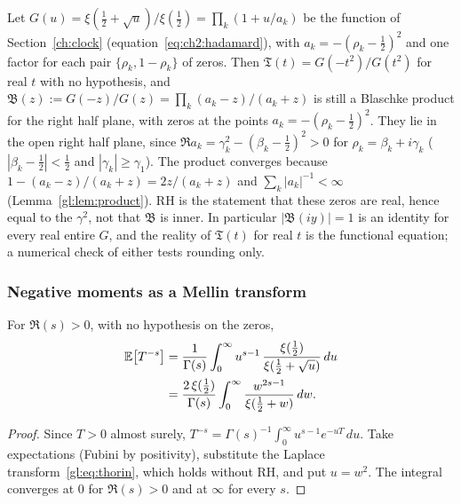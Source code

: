 \begin{remark}[Without RH]\label{gl:rem:blaschke}
Let $G(u)=\xi(\tfrac12+\sqrt u)/\xi(\tfrac12)=\prod_k(1+u/a_k)$ be the function of Section~\ref{ch:clock} (equation~\eqref{eq:ch2:hadamard}), with $a_k=-(\rho_k-\tfrac12)^2$ and one factor for each pair $\{\rho_k,1-\rho_k\}$ of zeros. Then $\mathfrak T(t)=G(-t^2)/G(t^2)$ for real $t$ with no hypothesis, and $\mathfrak B(z):=G(-z)/G(z)=\prod_k(a_k-z)/(a_k+z)$ is still a Blaschke product for the right half plane, with zeros at the points $a_k=-(\rho_k-\tfrac12)^2$. They lie in the open right half plane, since $\Re a_k=\gamma_k^2-(\beta_k-\tfrac12)^2>0$ for $\rho_k=\beta_k+i\gamma_k$ ($|\beta_k-\tfrac12|<\tfrac12$ and $|\gamma_k|\ge\gamma_1$). The product converges because $1-(a_k-z)/(a_k+z)=2z/(a_k+z)$ and $\sum_k|a_k|^{-1}<\infty$ (Lemma~\ref{gl:lem:product}). RH is the statement that these zeros are real, hence equal to the $\gamma^2$, not that $\mathfrak B$ is inner. In particular $|\mathfrak B(iy)|=1$ is an identity for every real entire $G$, and the reality of $\mathfrak T(t)$ for real $t$ is the functional equation; a numerical check of either tests rounding only.
\end{remark}

\subsubsection{Negative moments as a Mellin transform}

\begin{proposition}\label{gl:prop:negmom}
For $\Re(s)>0$, with no hypothesis on the zeros,
\begin{equation}\label{gl:eq:negmom}
\begin{aligned}
\mathbb{E}\big[T^{-s}\big] &= \frac{1}{\Gamma(s)}\int_0^\infty u^{s-1}\,\frac{\xi(\tfrac12)}{\xi(\tfrac12+\sqrt u)}\,du\\
&= \frac{2\,\xi(\tfrac12)}{\Gamma(s)}\int_0^\infty \frac{w^{2s-1}}{\xi(\tfrac12+w)}\,dw.
\end{aligned}
\end{equation}
\end{proposition}

\begin{proof}
Since $T>0$ almost surely, $T^{-s}=\Gamma(s)^{-1}\int_0^\infty u^{s-1}e^{-uT}\,du$. Take expectations (Fubini by positivity), substitute the Laplace transform~\eqref{gl:eq:thorin}, which holds without RH, and put $u=w^2$. The integral converges at $0$ for $\Re(s)>0$ and at $\infty$ for every $s$.
\end{proof}

